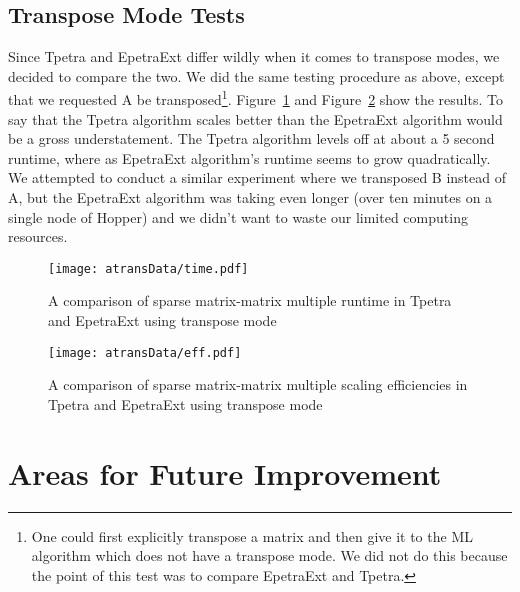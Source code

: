 \documentclass[pdf,12pt]{SANDreport}
\begin{document}
\subsection{Transpose Mode Tests}
Since Tpetra and EpetraExt differ wildly when it comes to transpose modes, we decided to compare the two. We did the same
testing procedure as above, except that we requested A be transposed\footnote{One could first explicitly transpose a 
matrix and then give it to the ML algorithm which does not have a transpose mode. We did not do this because the point of 
this test was to compare EpetraExt and Tpetra.}. Figure~\ref{transtime}
and Figure~\ref{transeff} show the results. To say that the Tpetra algorithm scales better than the EpetraExt algorithm
would be a gross understatement. The Tpetra algorithm levels off at about a 5 second runtime, where as EpetraExt 
algorithm's runtime seems to grow quadratically. We attempted to conduct a similar experiment where we transposed B 
instead of A, but the EpetraExt algorithm was taking even longer (over ten minutes on a single node of Hopper) and we 
didn't want to waste our limited computing resources. 

\begin{figure}
\centering
\texttt{[image: atransData/time.pdf]}
\caption[Transpose Time Comparison]{A comparison of sparse matrix-matrix multiple runtime in Tpetra and EpetraExt using 
transpose mode}
\label{transtime}
\end{figure}

\begin{figure}
\centering
\texttt{[image: atransData/eff.pdf]}
\caption[Transpose Efficiency Comparison]{A comparison of sparse matrix-matrix multiple scaling efficiencies in Tpetra and 
EpetraExt using transpose mode}
\label{transeff}
\end{figure}

\section{Areas for Future Improvement}
\end{document}

